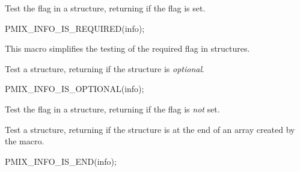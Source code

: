 \summary

Test the  flag in a  structure, returning  if the flag is set.

\cspecificstart
\begin{codepar}
PMIX_INFO_IS_REQUIRED(info);
\end{codepar}
\cspecificend

\begin{arglist}
\end{arglist}

This macro simplifies the testing of the required flag in  structures.


\summary

Test a  structure, returning  if the structure is \textit{optional}.

\cspecificstart
\begin{codepar}
PMIX_INFO_IS_OPTIONAL(info);
\end{codepar}
\cspecificend

\begin{arglist}
\end{arglist}

Test the  flag in a  structure, returning  if the flag is \textit{not} set.


\summary

Test a  structure, returning  if the structure is at the end of an array created by the  macro.

\cspecificstart
\begin{codepar}
PMIX_INFO_IS_END(info);
\end{codepar}
\cspecificend

\begin{arglist}
\end{arglist}

